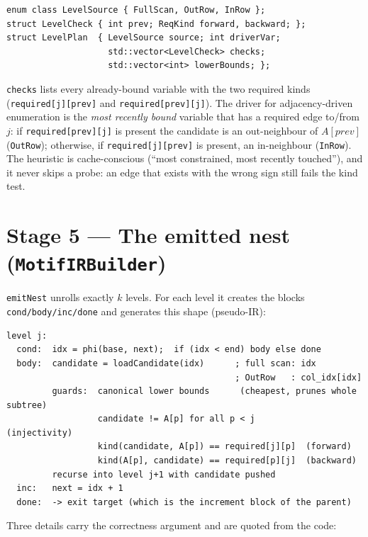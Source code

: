 \documentclass[11pt,a4paper]{article}
\newcommand{\code}[1]{\texttt{#1}}
\newcommand{\file}[1]{\texttt{#1}}
\begin{document}
\begin{lstlisting}[style=cpp]
enum class LevelSource { FullScan, OutRow, InRow };
struct LevelCheck { int prev; ReqKind forward, backward; };
struct LevelPlan  { LevelSource source; int driverVar;
                    std::vector<LevelCheck> checks;
                    std::vector<int> lowerBounds; };
\end{lstlisting}

\code{checks} lists every already-bound variable with the two required kinds
(\code{required[j][prev]} and \code{required[prev][j]}). The driver for
adjacency-driven enumeration is the \emph{most recently bound} variable that has
a required edge to/from $j$: if \code{required[prev][j]} is present the candidate
is an out-neighbour of $A[prev]$ (\code{OutRow}); otherwise, if
\code{required[j][prev]} is present, an in-neighbour (\code{InRow}). The heuristic
is cache-conscious (``most constrained, most recently touched''), and it never
skips a probe: an edge that exists with the wrong sign still fails the kind test.

\section{Stage 5 --- The emitted nest (\file{MotifIRBuilder})}
\label{sec:nest}

\code{emitNest} unrolls exactly $k$ levels. For each level it creates the blocks
\code{cond/body/inc/done} and generates this shape (pseudo-IR):

\begin{lstlisting}[style=plain]
level j:
  cond:  idx = phi(base, next);  if (idx < end) body else done
  body:  candidate = loadCandidate(idx)      ; full scan: idx
                                             ; OutRow   : col_idx[idx]
         guards:  canonical lower bounds      (cheapest, prunes whole subtree)
                  candidate != A[p] for all p < j          (injectivity)
                  kind(candidate, A[p]) == required[j][p]  (forward)
                  kind(A[p], candidate) == required[p][j]  (backward)
         recurse into level j+1 with candidate pushed
  inc:   next = idx + 1
  done:  -> exit target (which is the increment block of the parent)
\end{lstlisting}

Three details carry the correctness argument and are quoted from the code:
\end{document}
